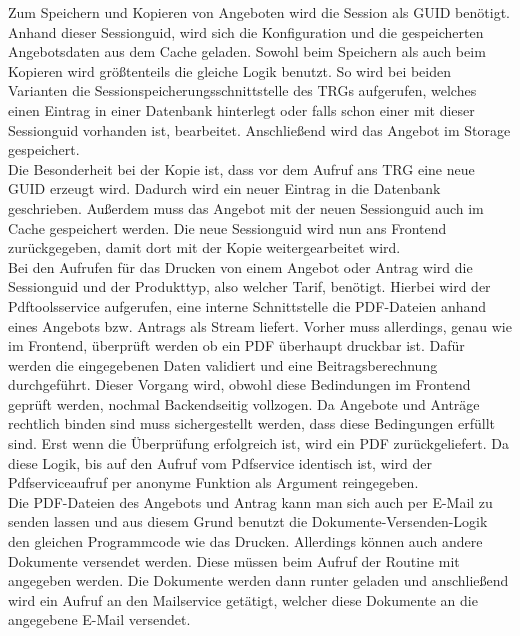 Zum Speichern und Kopieren von Angeboten wird die Session als \ac{GUID} benötigt. Anhand dieser Sessionguid, wird sich die Konfiguration und die gespeicherten Angebotsdaten aus dem Cache geladen. Sowohl beim Speichern als auch beim Kopieren wird größtenteils die gleiche Logik benutzt. So wird bei beiden Varianten die Sessionspeicherungsschnittstelle des \ac{TRG}s aufgerufen, welches einen Eintrag in einer Datenbank hinterlegt oder falls schon einer mit dieser Sessionguid vorhanden ist, bearbeitet. Anschließend wird das Angebot im Storage gespeichert. \\
Die Besonderheit bei der Kopie ist, dass vor dem Aufruf ans \ac{TRG} eine neue \ac{GUID} erzeugt wird. Dadurch wird ein neuer Eintrag in die Datenbank geschrieben. Außerdem muss das Angebot mit der neuen Sessionguid auch im Cache gespeichert werden. Die neue Sessionguid wird nun ans Frontend zurückgegeben, damit dort mit der Kopie weitergearbeitet wird.\\
Bei den Aufrufen für das Drucken von einem Angebot oder Antrag wird die Sessionguid und der Produkttyp, also welcher Tarif, benötigt. Hierbei wird der Pdftoolsservice aufgerufen, eine interne Schnittstelle die PDF-Dateien anhand eines Angebots bzw. Antrags als Stream liefert. Vorher muss allerdings, genau wie im Frontend, überprüft werden ob ein PDF überhaupt druckbar ist. Dafür werden die eingegebenen Daten validiert und eine Beitragsberechnung durchgeführt. Dieser Vorgang wird, obwohl diese Bedindungen im Frontend geprüft werden, nochmal Backendseitig vollzogen. Da Angebote und Anträge rechtlich binden sind muss sichergestellt werden, dass diese Bedingungen erfüllt sind. Erst wenn die Überprüfung erfolgreich ist, wird ein PDF zurückgeliefert. Da diese Logik, bis auf den Aufruf vom Pdfservice identisch ist, wird der Pdfserviceaufruf per anonyme Funktion als Argument reingegeben.\\
Die PDF-Dateien des Angebots und Antrag kann man sich auch per E-Mail zu senden lassen und aus diesem Grund benutzt die Dokumente-Versenden-Logik den gleichen Programmcode wie das Drucken. Allerdings können auch andere Dokumente versendet werden. Diese müssen beim Aufruf der Routine mit angegeben werden. Die Dokumente werden dann runter geladen und anschließend wird ein Aufruf an den Mailservice getätigt, welcher diese Dokumente an die angegebene E-Mail versendet.

